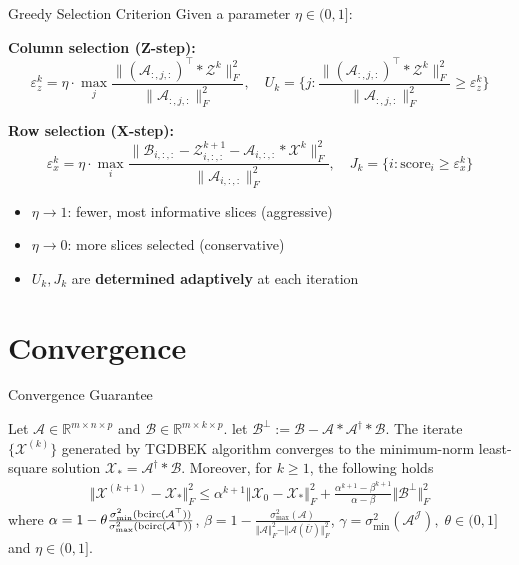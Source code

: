 \documentclass[aspectratio=169]{beamer}
\newcommand{\mcalA}{\mathcal{A}}
\newcommand{\mcalB}{\fm B}
\newcommand{\mcalX}{\mathcal{X}}
\newcommand{\mcalZ}{\mathcal{Z}}
\def\bcirc{{\rm bcirc}}
\def\mbbr{\mathbb R}
\def\fm#1{\mathcal{#1}}
\def\fm#1{\mathcal{#1}}
\begin{document}
\begin{frame}[shrink=20]{Greedy Selection Criterion}
  \small
  Given a parameter $\eta \in (0, 1]$:

  \smallskip
  \textbf{Column selection (Z-step):}
  \[
    \varepsilon_z^k = \eta \cdot \max_j
    \frac{\| (\mcalA_{:,j,:})^\top * \mcalZ^k \|_F^2}{\| \mcalA_{:,j,:} \|_F^2},
    \quad
    U_k = \Big\{ j :
    \frac{\| (\mcalA_{:,j,:})^\top * \mcalZ^k \|_F^2}{\| \mcalA_{:,j,:} \|_F^2}
    \geq \varepsilon_z^k \Big\}
  \]

  \smallskip
  \textbf{Row selection (X-step):}
  \[
    \varepsilon_x^k = \eta \cdot \max_i
    \frac{\| \mcalB_{i,:,:} - \mcalZ^{k+1}_{i,:,:} - \mcalA_{i,:,:} * \mcalX^k \|_F^2}{\| \mcalA_{i,:,:} \|_F^2},
    \quad
    J_k = \Big\{ i : \text{score}_i \geq \varepsilon_x^k \Big\}
  \]

  \smallskip
  \begin{itemize}
    \item $\eta \to 1$: fewer, most informative slices (aggressive)
    \item $\eta \to 0$: more slices selected (conservative)
    \item $U_k, J_k$ are \textbf{determined adaptively} at each iteration
  \end{itemize}
\end{frame}

\section{Convergence}
\begin{frame}{Convergence Guarantee}
  \begin{theorem} 
    Let $\mcalA \in \mbbr^{m \times n \times p}$ and $\mcalB \in \mbbr^{m \times k \times p}$. let $\fm B^\perp := \fm B - \fm A *\fm A^\dagger *\fm B$. The iterate $\{\fm X^{(k)}\}$ generated  by TGDBEK algorithm  converges
     to the minimum-norm least-square solution $\fm X_\ast = \fm A^\dagger * \fm B$. Moreover, for $k\geq 1$, the following holds
\begin{align*}
    \Vert \fm X ^{(k+1)} - \fm X_\ast \Vert_F^2 \leq \alpha^{k+1}\Vert \fm X_0 - \fm X_\ast \Vert_F^2 + \frac{\alpha^{k+1}-\beta^{k+1}}{\alpha - \beta}\Vert \fm B^\perp \Vert_F^2
\end{align*}
where $ \alpha = 1 - \theta \frac{\sigma_{\min}^2(\bcirc(\fm A^\top))}{\sigma^2_{\max}(\bcirc(\fm A^\top ))}$, $\beta = 1- \frac{\sigma^2_{\max}(\fm A)}{\Vert \fm A \Vert^2_F - \Vert \fm A(\overline{U}) \Vert_F^2}$, $\gamma = \sigma^2_{\min}(\fm A^{\fm J}), \; \theta \in (0,1]$ and $\eta \in (0, 1]$.
\end{theorem} 
\end{frame}
\end{document}
